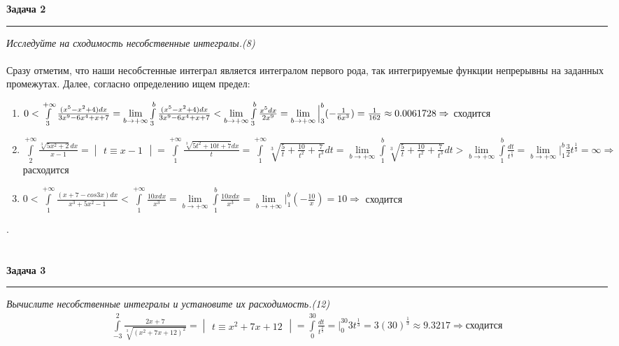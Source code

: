 \documentclass[a4paper,11pt]{article}
\begin{document}
\textbf{\large Задача 2}
\medskip\hrule\medskip
\textit{Исследуйте на сходимость несобственные интегралы.(8)} \\ \\
Сразу отметим, что наши несобстенные интеграл является интегралом первого рода, так интегрируемые функции непрерывны на заданных промежутах. Далее, согласно определению ищем предел:
\begin{enumerate}
	\item 
	$ 0 < \int\limits_{3}^{+\infty} \frac{(x^5 - x^2 + 4)dx}{3x^9 - 6x^4 + x + 7} = 
	\lim\limits_{b \to +\infty}\int\limits_{3}^{b} \frac{(x^5 - x^2 + 4)dx}{3x^9 - 6x^4 + x + 7} < 
	\lim\limits_{b \to +\infty}\int\limits_{3}^{b} \frac{x^5dx}{2x^9} = 
	\lim\limits_{b \to +\infty}\Big|_{3}^{b} (-\frac{1}{6x^3}) = \frac1{162} \\[4pt] \approx 0.0061728 \Rightarrow $  сходится
	
	\item
	$ \int\limits_{2}^{+\infty} \frac{\sqrt[3]{5x^2 + 2}dx}{x - 1} = 
	\begin{vmatrix} t \equiv x - 1 \end{vmatrix} =
	\int\limits_{1}^{+\infty} \frac{\sqrt[3]{5t^2 + 10t + 7}dx}{t} = 
	\int\limits_{1}^{+\infty} \sqrt[3]{\frac5{t} + \frac{10}{t^2} + \frac7{t^3}}dt = 
	\lim\limits_{b \to +\infty}\int\limits_{1}^{b} \sqrt[3]{\frac5{t} + \frac{10}{t^2} + \frac7{t^3}}dt >
	\lim\limits_{b \to +\infty}\int\limits_{1}^{b} \frac{dt}{t^{\frac13}} = 
	\lim\limits_{b \to +\infty}\Big|_{1}^{b} \frac32t^{\frac13} = \infty \Rightarrow
	$ расходится
	
	\item
	$ 0 < \int\limits_{1}^{+\infty} \frac{(x + 7 - cos 3x)dx}{x^3 + 5x^2 - 1} <	
	\int\limits_{1}^{+\infty} \frac{10xdx}{x^3} = 
	\lim\limits_{b \to +\infty} \int\limits_{1}^{b} \frac{10xdx}{x^3} = 
	\lim\limits_{b \to +\infty} \Big|_{1}^{b} (-\frac{10}{x}) = 10 \Rightarrow
	$ сходится
\end{enumerate}
.\\ \\ \\



\textbf{\large Задача 3}
\medskip\hrule\medskip
\textit{Вычислите несобственные интегралы и установите их расходимость.(12)}
\begin{gather*}
\int\limits_{-3}^{2} \frac{2x + 7}{\sqrt[3]{(x^2 + 7x + 12)^2}} = 
\begin{vmatrix} t \equiv x^2 + 7x + 12 \end{vmatrix} =
\int\limits_{0}^{30} \frac{dt}{t^{\frac23}} = 
\Big|_{0}^{30} 3t^{\frac13} = 3(30)^{\frac13} \approx 9.3217 \Rightarrow \text{сходится}
\end{gather*}
\newpage 
\end{document}
